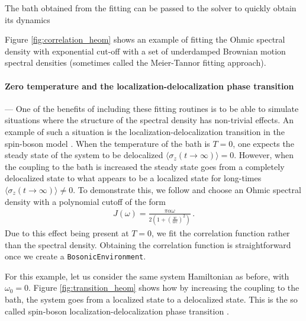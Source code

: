 \documentclass[preprint,3p,sort&compress]{elsarticle}
\def\code#1{\texttt{#1}}
\begin{document}
The bath obtained from the fitting can be passed to the solver to quickly obtain its dynamics


Figure \ref{fig:correlation_heom} shows an example of fitting the Ohmic spectral density with exponential cut-off with a set of underdamped Brownian motion spectral densities (sometimes called the Meier-Tannor fitting approach).

\paragraph{Zero temperature and the localization-delocalization phase transition} --- One of the benefits of including these fitting routines is to be able to simulate situations where the structure of the spectral density has non-trivial effects. An example of such a situation is the localization-delocalization transition in the spin-boson model \cite{xu_taming_2022,Wenderoth_Breuer_Thoss_2021,Zhou_Shao_2008,Wang_Thoss_2008}. When the temperature of the bath is $T=0$, one expects the steady state of the system to be 
 delocalized $\langle \sigma_z(t\rightarrow \infty) \rangle = 0$. However, when the coupling to the bath is increased the steady state goes from a completely delocalized state to what appears to be a localized state for long-times $\langle \sigma_z(t\rightarrow \infty) \rangle \neq 0$. To demonstrate this, we follow \cite{Zhou_Shao_2008} and choose an Ohmic spectral density with a polynomial cutoff of the form 
\begin{align}
    J(\omega)= \frac{\pi \alpha \omega}{2(1+(\frac{w}{wc})^{2})} \, .
\end{align}
Due to this effect being present at $T=0$, we fit the correlation function rather than the spectral density. Obtaining the correlation function is straightforward once we create a \code{BosonicEnvironment}.


For this example, let us consider the same system Hamiltonian as before, with $\omega_{0}=0$. Figure \ref{fig:transition_heom} shows how by increasing the coupling to the bath, the system goes from a localized state to a delocalized state. This is the so called spin-boson localization-delocalization phase transition \cite{xu_taming_2022}. 
\end{document}
